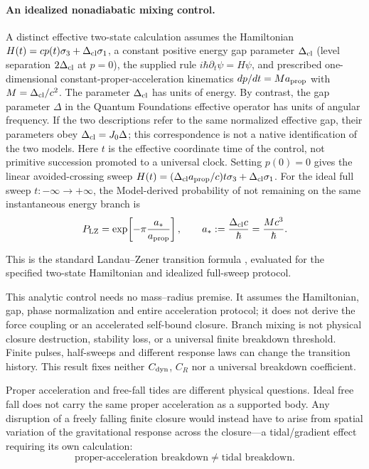 \documentclass[11pt]{article}
\theoremstyle{plain}
\theoremstyle{remark}
\begin{document}
\paragraph{An idealized nonadiabatic mixing control.}
A distinct effective two-state calculation assumes the Hamiltonian
$H(t)=cp(t)\sigma_3+\Delta_{\rm cl}\sigma_1$, a constant positive
energy gap parameter $\Delta_{\rm cl}$ (level separation $2\Delta_{\rm cl}$
at $p=0$), the supplied rule $i\hbar\partial_t\psi=H\psi$, and prescribed
one-dimensional constant-proper-acceleration kinematics
$dp/dt=Ma_{\rm prop}$ with $M=\Delta_{\rm cl}/c^2$.
The parameter $\Delta_{\rm cl}$ has units of energy.  By contrast,
the gap parameter $\Delta$ in the Quantum Foundations effective
operator has units of angular frequency.  If the two descriptions
refer to the same normalized effective gap, their parameters obey
$\Delta_{\rm cl}=J_0\Delta$; this correspondence is not a native
identification of the two models.
Here $t$ is the effective coordinate time of the control, not primitive
succession promoted to a universal clock.  Setting $p(0)=0$ gives the
linear avoided-crossing sweep
$H(t)=(\Delta_{\rm cl}a_{\rm prop}/c)t\sigma_3+\Delta_{\rm cl}\sigma_1$.
For the ideal full sweep $t:-\infty\to+\infty$, the Model-derived
probability of not remaining on the same instantaneous energy branch is
\[
 P_{\rm LZ}=\exp\!\left[-\pi\frac{a_*}{a_{\rm prop}}\right],
 \qquad a_*:=\frac{\Delta_{\rm cl}c}{\hbar}=\frac{Mc^3}{\hbar}.
\]

This is the standard Landau--Zener transition formula
\cite{Landau1932EnergyTransferII,Zener1932NonAdiabatic},
evaluated for the specified two-state Hamiltonian
and idealized full-sweep protocol.

This analytic control needs no mass--radius premise.  It assumes the
Hamiltonian, gap, phase normalization and entire acceleration protocol;
it does not derive the force coupling or an accelerated self-bound closure.
Branch mixing is not physical closure destruction, stability loss, or
a universal finite breakdown threshold.  Finite pulses, half-sweeps and
different response laws can change the transition history.  This result
fixes neither $C_{\rm dyn}$, $C_R$ nor a universal breakdown coefficient.

Proper acceleration and free-fall tides are different physical questions.  Ideal free
fall does not carry the same proper acceleration as a supported body.  Any disruption of
a freely falling finite closure would instead have to arise from spatial variation of
the gravitational response across the closure---a tidal/gradient effect requiring its
own calculation:
\begin{equation}
\boxed{
\text{proper-acceleration breakdown}
\neq
\text{tidal breakdown}.}
\end{equation}
\end{document}
